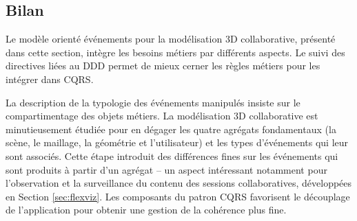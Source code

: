 %	

\subsection{Bilan}

Le modèle orienté événements pour la modélisation \gls{3D} collaborative, présenté 
dans cette section, intègre les besoins métiers par différents aspects. Le suivi des 
directives liées au \gls{DDD} permet de mieux cerner les règles 
métiers pour les intégrer dans \gls{CQRS}. 

La description de la typologie des événements manipulés insiste sur le compartimentage 
des objets métiers. La modélisation \gls{3D} collaborative est minutieusement étudiée 
pour en dégager les quatre agrégats fondamentaux (la scène, le maillage, la géométrie 
et l'utilisateur) et les types d'événements qui leur sont associés. Cette étape introduit 
des différences fines sur les événements qui sont produits à partir d'un agrégat 
-- un aspect intéressant notamment pour l'observation et la surveillance du contenu 
des sessions collaboratives, développées en Section \ref{sec:flexviz}.
Les composants du patron \gls{CQRS} favorisent le découplage de l'application 
pour obtenir une gestion de la cohérence plus fine. 

